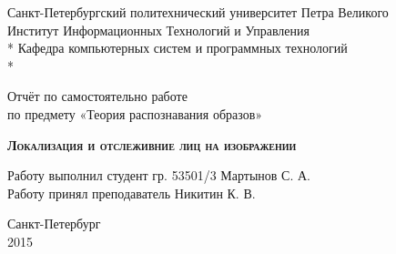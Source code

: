 \begin{titlepage}
\thispagestyle{empty}

\begin{center}
Санкт-Петербургский политехнический университет Петра Великого\\
Институт Информационных Технологий и Управления \\*
Кафедра компьютерных систем и программных технологий \\*
\hrulefill
\end{center}

\vspace{10em}

\begin{center}
\Large Отчёт по самостоятельно работе\\по предмету «Теория распознавания образов» \\
\end{center}

\vspace{1em}

\begin{center}
\textsc{\textbf{Локализация и отслеживние лиц на изображении}}
\end{center}

\vspace{16em}

\begin{flushleft}
Работу выполнил студент гр. 53501/3 \hrulefill Мартынов С. А. \\
\vspace{1.5em}
Работу принял преподаватель \hrulefill Никитин К. В. \\
\end{flushleft}

\vspace{\fill}

\begin{center}
Санкт-Петербург \\
2015
\end{center}

\end{titlepage}
\setcounter{page}{2}